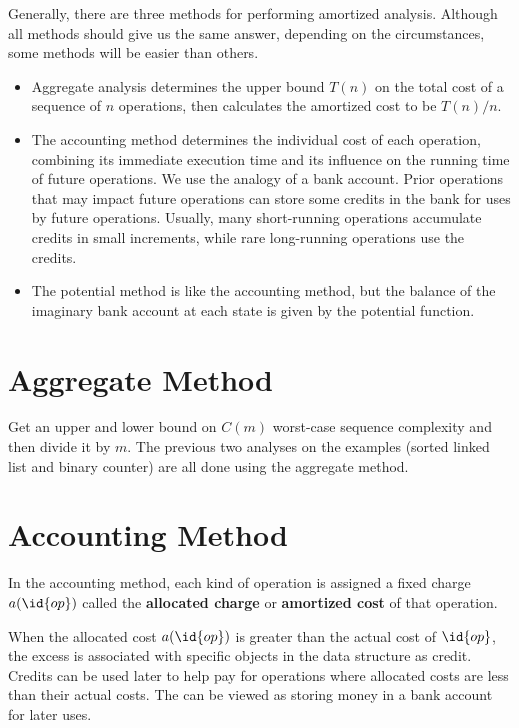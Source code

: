 Generally, there are three methods for performing amortized analysis. Although all methods should give us the same answer, depending on the circumstances, some methods will be easier than others.

\begin{itemize}
    \item Aggregate analysis determines the upper bound $T(n)$ on the total cost of a sequence of $n$
    operations, then calculates the amortized cost to be $T(n) / n$.
    \item The accounting method determines the individual cost of each operation, combining its immediate execution time and its influence on the running time of future operations. We use the analogy of a bank account. Prior operations that may impact future operations can store some credits in the bank for uses by future operations. Usually, many short-running operations accumulate credits in small increments, while rare long-running operations use the credits.
    \item The potential method is like the accounting method, but the balance of the imaginary bank account at each state is given by the potential function.
\end{itemize}

\section{Aggregate Method} 

Get an upper and lower bound on $C(m)$ worst-case sequence complexity and then divide it by $m$. The previous two analyses on the examples (sorted linked list and binary counter) are all done using the aggregate method.

\section{Accounting Method} 

In the accounting method, each kind of operation is assigned a fixed charge $a(\id{op})$ called the \textbf{allocated charge} or \textbf{amortized cost} of that operation.  

When the allocated cost $a(\id{op})$ is greater than the actual cost of $\id{op}$, the excess is associated with specific objects in the data structure as credit. Credits can be used later to help pay for operations where allocated costs are less than their actual costs. The can be viewed as storing money in a bank account for later uses.

